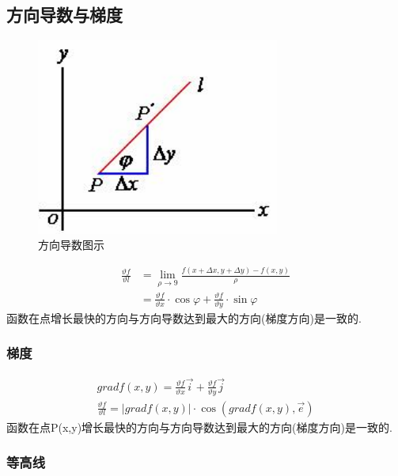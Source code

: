 \documentclass[10pt, a4paper, oneside]{ctexart}
\begin{document}
\begin{sloppypar}
	\subsection{方向导数与梯度}
	\begin{figure}[htbp]
		\centering
		\includegraphics[width=8cm]{image016.jpg}
		\caption{方向导数图示}
	\end{figure}
	\begin{align*}
		\frac{\vartheta f}{\vartheta l} & =\lim_{\rho\to 9}\frac{f(x+\Delta x, y + \Delta y) - f(x,y)}{\rho}                               \\
		                                & =\frac{\vartheta f}{\vartheta x}\cdot\cos\varphi+\frac{\vartheta f}{\vartheta y}\cdot\sin\varphi
	\end{align*}
	函数在点增长最快的方向与方向导数达到最大的方向(梯度方向)是一致的.
	\subsubsection{梯度}
	\begin{gather*}
		gradf(x,y)=\frac{\vartheta f}{\vartheta x}\overrightarrow{i}+\frac{\vartheta f}{\vartheta y}\overrightarrow{j}\\
		\frac{\vartheta f}{\vartheta l}=\left\lvert gradf(x,y)\right\rvert \cdot \cos (gradf(x,y),\overrightarrow{e})
	\end{gather*}
	函数在点P(x,y)增长最快的方向与方向导数达到最大的方向(梯度方向)是一致的.
	\subsubsection{等高线}

\end{sloppypar}
\end{document}
